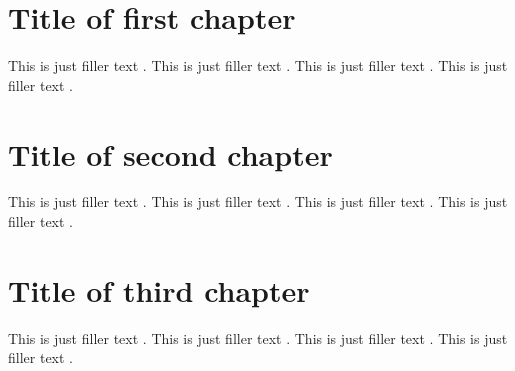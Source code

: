 \documentclass[a4paper,oneside]{book}
\begin{document}
\chapter{Title of first chapter}
\begin{refsection}
This is just filler text \parencite{massa}.
This is just filler text \parencite{augustine}.
This is just filler text \parencite{cotton}.
This is just filler text \parencite{hammond}.
\printbibliography[heading=subbibliography]
\end{refsection}

\chapter{Title of second chapter}
\begin{refsection}
This is just filler text \parencite{hammond}.
This is just filler text \parencite{massa}.
This is just filler text \parencite{cotton}.
This is just filler text \parencite{murray}.
\printbibliography[heading=subbibliography]
\end{refsection}

\chapter{Title of third chapter}
\begin{refsection}
This is just filler text \parencite{murray}.
This is just filler text \parencite{augustine}.
This is just filler text \parencite{cotton}.
This is just filler text \parencite{bertram}.
\printbibliography[heading=subbibliography]
\end{refsection}
\end{document}
